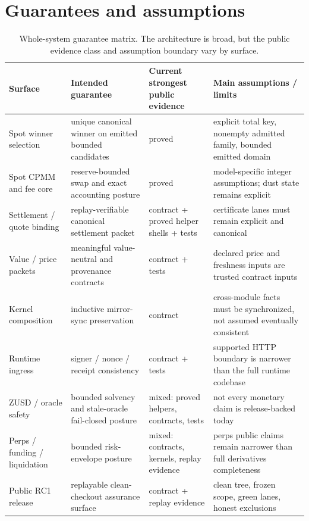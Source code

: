 \documentclass[10pt]{extarticle}
\begin{document}
\section{Guarantees and assumptions}
\begin{table}[t]
\centering
\small
\begin{tabular}{@{}L{31mm}L{23mm}L{26mm}L{54mm}@{}}
\toprule
Surface & Intended guarantee & Current strongest public evidence & Main assumptions / limits \\
\midrule
Spot winner selection & unique canonical winner on emitted bounded candidates & proved & explicit total key, nonempty admitted family, bounded emitted domain \\
Spot CPMM and fee core & reserve-bounded swap and exact accounting posture & proved & model-specific integer assumptions; dust state remains explicit \\
Settlement / quote binding & replay-verifiable canonical settlement packet & contract + proved helper shells + tests & certificate lanes must remain explicit and canonical \\
Value / price packets & meaningful value-neutral and provenance contracts & contract + tests & declared price and freshness inputs are trusted contract inputs \\
Kernel composition & inductive mirror-sync preservation & contract & cross-module facts must be synchronized, not assumed eventually consistent \\
Runtime ingress & signer / nonce / receipt consistency & contract + tests & supported HTTP boundary is narrower than the full runtime codebase \\
ZUSD / oracle safety & bounded solvency and stale-oracle fail-closed posture & mixed: proved helpers, contracts, tests & not every monetary claim is release-backed today \\
Perps / funding / liquidation & bounded risk-envelope posture & mixed: contracts, kernels, replay evidence & perps public claims remain narrower than full derivatives completeness \\
Public RC1 release & replayable clean-checkout assurance surface & contract + replay evidence & clean tree, frozen scope, green lanes, honest exclusions \\
\bottomrule
\end{tabular}
\caption{Whole-system guarantee matrix. The architecture is broad, but the public evidence class and assumption boundary vary by surface.}
\end{table}
\end{document}
